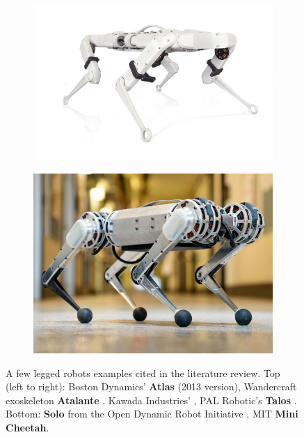 \begin{figure}[h]
    \begin{subfigure}{0.4\textwidth}
        \includegraphics[width=\textwidth]{figures/SOLO_isolated-shadow-1024x662.png}
    \end{subfigure}%
    \begin{subfigure}{0.35\textwidth}
        \includegraphics[width=\textwidth]{figures/minicheetah-photo1-full.jpg}
    \end{subfigure}%
    \caption{A few legged robots examples cited in the literature review.
    Top (left to right): Boston Dynamics' \textbf{Atlas} (2013 version), Wandercraft exoskeleton \textbf{Atalante} \cite{harib2018feedback}
    , Kawada Industries' \mbox{\textbf{}}, PAL Robotic's \textbf{Talos} \cite{stasse2017talos}. 
    Bottom: \textbf{Solo} from the Open Dynamic Robot Initiative \cite{grimminger2020open}, MIT \textbf{Mini Cheetah}.}
    \label{fig:robots}
\end{figure}

